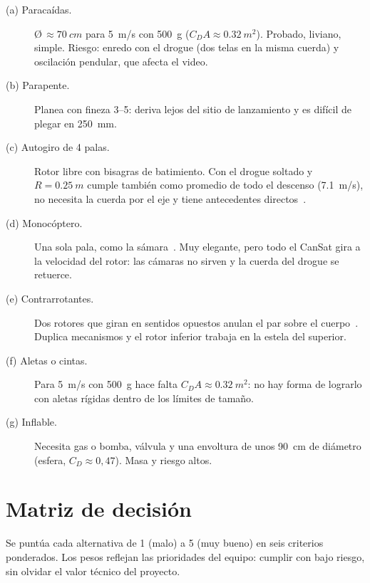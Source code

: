 \begin{description}
  \item[(a) Paracaídas.] Ø\,$\approx\SI{70}{cm}$ para \SI{5}{m/s} con \SI{500}{g} ($C_D A\approx\SI{0.32}{m^2}$).
        Probado, liviano, simple. Riesgo: enredo con el drogue (dos telas en la misma
        cuerda) y oscilación pendular, que afecta el video.
  \item[(b) Parapente.] Planea con fineza 3--5: deriva lejos del sitio de lanzamiento y
        es difícil de plegar en \SI{250}{mm}.
  \item[(c) Autogiro de 4 palas.] Rotor libre con bisagras de batimiento. Con el drogue
        soltado y $R=\SI{0.25}{m}$ cumple  también como promedio de todo el descenso
        (\SI{7.1}{m/s}), no necesita la cuerda por el eje y tiene antecedentes
        directos~\cite{cansat2019,cansat2025,ventura2022}.
  \item[(d) Monocóptero.] Una sola pala, como la sámara~\cite{norberg1973}. Muy elegante,
        pero todo el CanSat gira a la velocidad del rotor: las cámaras no sirven y la
        cuerda del drogue se retuerce.
  \item[(e) Contrarrotantes.] Dos rotores que giran en sentidos opuestos anulan el par
        sobre el cuerpo~\cite{ventura2022}. Duplica mecanismos y el rotor inferior
        trabaja en la estela del superior.
  \item[(f) Aletas o cintas.] Para \SI{5}{m/s} con \SI{500}{g} hace falta
        $C_D A\approx\SI{0.32}{m^2}$: no hay forma de lograrlo con aletas rígidas dentro
        de los límites de tamaño.
  \item[(g) Inflable.] Necesita gas o bomba, válvula y una envoltura de unos
        \SI{90}{cm} de diámetro (esfera, $C_D\approx0{,}47$). Masa y riesgo altos.
\end{description}

\section{Matriz de decisión}
Se puntúa cada alternativa de 1 (malo) a 5 (muy bueno) en seis criterios ponderados.
Los pesos reflejan las prioridades del equipo: cumplir  con bajo riesgo, sin
olvidar el valor técnico del proyecto.

